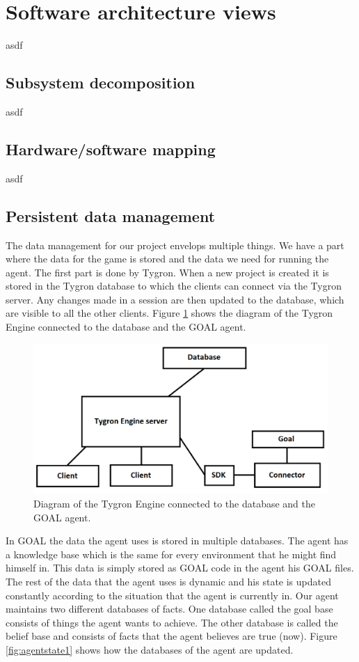 \section{Software architecture views}
asdf
\subsection{Subsystem decomposition}
asdf
\subsection{Hardware/software mapping}
asdf
\subsection{Persistent data management}



The data management for our project envelops multiple things. We have a part where the data for the game is stored and the data we need for running the agent. The first part is done by Tygron. When a new project is created it is stored in the Tygron database to which the clients can connect via the Tygron server. Any changes made in a session are then updated to the database, which are visible to all the other clients. Figure \ref{fig:tygron1} shows the diagram of the Tygron Engine connected to the database and the GOAL agent.

\begin{figure}[h!]
  \includegraphics[width=\linewidth]{Tygrondatabase.png}
  \caption{Diagram of the Tygron Engine connected to the database and the GOAL agent.}
  \label{fig:tygron1}
\end{figure}

In GOAL the data the agent uses is stored in multiple databases. The agent has a knowledge base which is the same for every environment that he might find himself in. This data is simply stored as GOAL code in the agent his GOAL files. The rest of the data that the agent uses is dynamic and his state is updated constantly according to the situation that the agent is currently in. Our agent maintains two different databases of facts. One database called the goal base consists of things the agent wants to achieve. The other database is called the belief base and consists of facts that the agent believes are true (now).  Figure \ref{fig:agentstate1} shows how the databases of the agent are updated.

